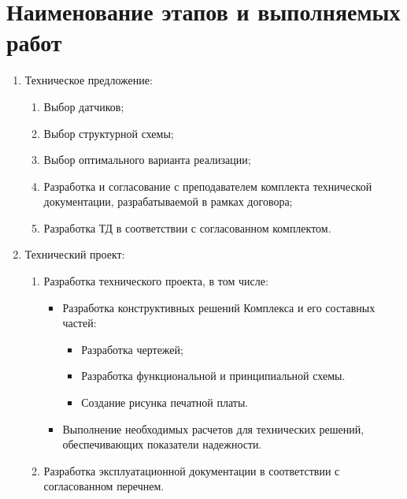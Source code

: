 	\section{Наименование этапов и выполняемых работ}
		\begin{enumerate}
			\item Техническое предложение:
				\begin{enumerate}
					\item Выбор датчиков;
					\item Выбор структурной схемы;
					\item Выбор оптимального варианта реализации;
					\item Разработка и согласование с преподавателем комплекта технической документации, разрабатываемой в рамках договора;
					\item Разработка ТД в соответствии с согласованном комплектом.
				\end{enumerate}
			\item Технический проект:
				\begin{enumerate}
					\item Разработка технического проекта, в том числе:
						\begin{itemize}
							\item Разработка конструктивных решений Комплекса и его составных частей:
								\begin{itemize}
									\item Разработка чертежей;
									\item Разработка функциональной и принципиальной схемы.
									\item Создание рисунка печатной платы.
								\end{itemize}
							\item Выполнение необходимых расчетов для технических решений, обеспечивающих показатели надежности.
						\end{itemize}
					\item Разработка эксплуатационной документации в соответствии с согласованном перечнем.
				\end{enumerate}
		\end{enumerate}
